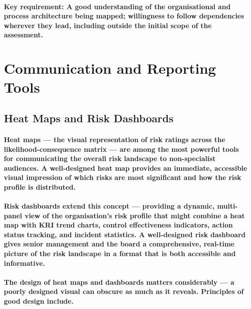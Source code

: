 \paragraph{\textbf{Key requirement}: A good understanding of the organisational and process architecture being mapped; willingness to follow dependencies wherever they lead, including outside the initial scope of the assessment.}

\section{Communication and Reporting Tools}

\subsection{Heat Maps and Risk Dashboards}
\paragraph{\textbf{Heat maps} — the visual representation of risk ratings across the likelihood-consequence matrix — are among the most powerful tools for communicating the overall risk landscape to non-specialist audiences. A well-designed heat map provides an immediate, accessible visual impression of which risks are most significant and how the risk profile is distributed.}
\paragraph{\textbf{Risk dashboards} extend this concept — providing a dynamic, multi-panel view of the organisation's risk profile that might combine a heat map with KRI trend charts, control effectiveness indicators, action status tracking, and incident statistics. A well-designed risk dashboard gives senior management and the board a comprehensive, real-time picture of the risk landscape in a format that is both accessible and informative.}
\paragraph{The design of heat maps and dashboards matters considerably — a poorly designed visual can obscure as much as it reveals. Principles of good design include.}
\begin{itemize}
\end{itemize}
